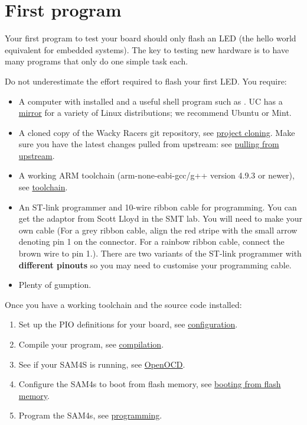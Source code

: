 \chapter{First program}
\label{first-program}

Your first program to test your board should only flash an LED (the
hello world equivalent for embedded systems). The key to testing new
hardware is to have many programs that only do one simple task each.

Do not underestimate the effort required to flash your first LED. You
require:
%
\begin{itemize}
\item
  A computer with  installed and a useful shell program
  such as . UC has a
  \href{http://ucmirror.canterbury.ac.nz/}{mirror} for a variety of
  Linux distributions; we recommend Ubuntu or Mint.

\item A cloned copy of the Wacky Racers git repository, see
  \hyperref[project-cloning]{project cloning}. Make sure you have the
  latest changes pulled from upstream: see
  \hyperref[git-pulling-from-upstream]{pulling from upstream}.

\item
  A working ARM toolchain (arm-none-eabi-gcc/g++ version 4.9.3 or
  newer), see \hyperref[toolchain]{toolchain}.

\item
  An ST-link programmer and 10-wire ribbon cable for programming. You
  can get the adaptor from Scott Lloyd in the SMT lab. You will need
  to make your own cable (For a grey ribbon cable, align the red
  stripe with the small arrow denoting pin 1 on the connector. For a
  rainbow ribbon cable, connect the brown wire to pin 1.). There are
  two variants of the ST-link programmer with \textbf{different
  pinouts} so you may need to customise your programming cable.
\item
  Plenty of gumption.
\end{itemize}


Once you have a working toolchain and the source code installed:
%
\begin{enumerate}
\item Set up the PIO definitions for your board, see
  \hyperref[configuration]{configuration}.

\item Compile your program, see \hyperref[compilation]{compilation}.

\item See if your SAM4S is running, see \hyperref[openocd]{OpenOCD}.

\item Configure the SAM4s to boot from flash memory, see
  \hyperref[booting-from-flash-memory]{booting from flash memory}.

\item Program the SAM4s, see \hyperref[programming]{programming}.
\end{enumerate}


